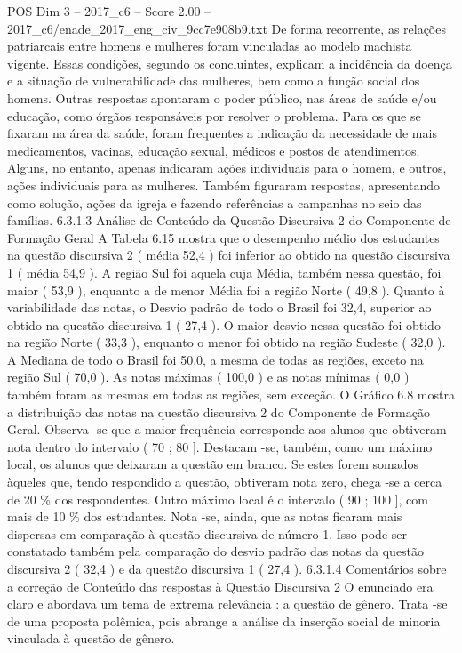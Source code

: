 \begin{textsample}{POS Dim 3 – 2017\_c6 – Score 2.00 – 2017\_c6/enade\_2017\_eng\_civ\_9cc7e908b9.txt}
De forma recorrente, as relações patriarcais entre homens e mulheres foram vinculadas ao modelo machista vigente.
Essas condições, segundo os concluintes, explicam a incidência da doença e a situação de vulnerabilidade das mulheres, bem como a função social dos homens.
Outras respostas apontaram o poder público, nas áreas de saúde e/ou educação, como órgãos responsáveis por resolver o problema.
Para os que se fixaram na área da saúde, foram frequentes a indicação da necessidade de mais medicamentos, vacinas, educação sexual, médicos e postos de atendimentos.
Alguns, no entanto, apenas indicaram ações individuais para o homem, e outros, ações individuais para as mulheres.
Também figuraram respostas, apresentando como solução, ações da igreja e fazendo referências a campanhas no seio das famílias. 6.3.1.3 Análise de Conteúdo da Questão Discursiva 2 do Componente de Formação Geral A Tabela 6.15 mostra que o desempenho médio dos estudantes na questão discursiva 2 ( média 52,4 ) foi inferior ao obtido na questão discursiva 1 ( média 54,9 ).
A região Sul foi aquela cuja Média, também nessa questão, foi maior ( 53,9 ), enquanto a de menor Média foi a região Norte ( 49,8 ).
Quanto à variabilidade das notas, o Desvio padrão de todo o Brasil foi 32,4, superior ao obtido na questão discursiva 1 ( 27,4 ).
O maior desvio nessa questão foi obtido na região Norte ( 33,3 ), enquanto o menor foi obtido na região Sudeste ( 32,0 ).
A Mediana de todo o Brasil foi 50,0, a mesma de todas as regiões, exceto na região Sul ( 70,0 ).
As notas máximas ( 100,0 ) e as notas mínimas ( 0,0 ) também foram as mesmas em todas as regiões, sem exceção.
O Gráfico 6.8 mostra a distribuição das notas na questão discursiva 2 do Componente de Formação Geral.
Observa -se que a maior frequência corresponde aos alunos que obtiveram nota dentro do intervalo ( 70 ; 80 ].
Destacam -se, também, como um máximo local, os alunos que deixaram a questão em branco.
Se estes forem somados àqueles que, tendo respondido a questão, obtiveram nota zero, chega -se a cerca de 20 \% dos respondentes.
Outro máximo local é o intervalo ( 90 ; 100 ], com mais de 10 \% dos estudantes.
Nota -se, ainda, que as notas ficaram mais dispersas em comparação à questão discursiva de número 1.
Isso pode ser constatado também pela comparação do desvio padrão das notas da questão discursiva 2 ( 32,4 ) e da questão discursiva 1 ( 27,4 ). 6.3.1.4 Comentários sobre a correção de Conteúdo das respostas à Questão Discursiva 2 O enunciado era claro e abordava um tema de extrema relevância : a questão de gênero.
Trata -se de uma proposta polêmica, pois abrange a análise da inserção social de minoria vinculada à questão de gênero.

\end{textsample}
